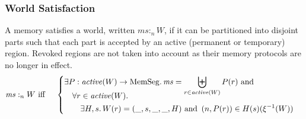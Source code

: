 \documentclass[format=acmsmall, review=true, screen=true]{acmart}
\DeclareMathOperator{\dom}{dom}
\newcommand{\var}[1]{\mathit{#1}}
\newcommand{\hs}{\var{ms}}
\newcommand{\ms}{\hs}
\newcommand{\heap}{\var{mem}}
\newcommand{\plainfun}[2]{
  \ifthenelse{\equal{#2}{}}
  {\mathit{#1}}
  {\mathit{#1}(#2)}
}
\newcommand{\activeReg}[1]{\plainfun{active}{#1}}
\newcommand{\futurewk}{\mathbin{\sqsupseteq}^{\var{pub}}}
\newcommand{\futurestr}{\mathbin{\sqsupseteq}^{\var{priv}}}
\newcommand{\heapSat}[3][\heap]{#1 :_{#2} #3}
\newcommand{\memSat}[3][n]{\heapSat[#2]{#1}{#3}}
\newcommand{\plaindom}[1]{\mathrm{#1}}
\newcommand{\HeapSegments}{\plaindom{MemSeg}}
\newcommand{\npair}[2][n]{\left(#1,#2 \right)}
\begin{document}


\subsubsection{World Satisfaction}
A memory satisfies a world, written $\memSat{\ms}{W}$, if it can be partitioned
into disjoint parts such that each part is accepted by an active (permanent or
temporary) region.  Revoked regions are not taken into account as their memory protocols are no longer in effect.
\begin{align*}
  &\memSat{\ms}{W}
    \text{ iff }\quad \left\{\begin{aligned}
        &\exists P : \activeReg{W} \rightarrow \HeapSegments \ldotp \hs = \biguplus_{r\in\activeReg{W}}P(r) \text{ and } \\[-.35cm]
        &\quad \forall r \in \activeReg{W} \ldotp\\
        &\quad \quad \exists H,s \ldotp W(r) = (\_,s,\_,\_,H) \text{ and } \npair[n]{P(r)} \in H(s)(\xi^{-1}(W))\\
      \end{aligned}\right.
\end{align*}
\end{document}
